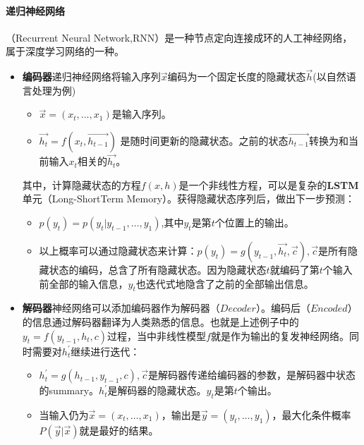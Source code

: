 \paragraph{递归神经网络}\cite{ wiki:RNN}（Recurrent Neural Network,RNN）是一种节点定向连接成环的人工神经网络，属于深度学习网络的一种。
\begin{itemize}
  \item \textbf{编码器}递归神经网络将输入序列$\vec{x}$编码为一个固定长度的隐藏状态$\vec{h}$(以自然语言处理为例)
  \begin{itemize}
    \item $\vec{x}=\left(x_{t}, \ldots, x_{1}\right)$是输入序列。
    \item $\overrightarrow{h_{t}}=f\left(x_{t}, \overrightarrow{h_{t-1}}\right)$ 是随时间更新的隐藏状态。之前的状态$\overrightarrow{h_{t-1}}$转换为和当前输入$x_t$相关的$\overrightarrow{h_{t}}$。
  \end{itemize}
  其中，计算隐藏状态的方程$f(x,h)$是一个非线性方程，可以是复杂的\textbf{LSTM}单元（Long-ShortTerm Memory）。获得隐藏状态序列后，做出下一步预测：
  \begin{itemize}
    \item $p\left(y_{t}\right)=p\left(y_{t} | y_{t-1}, \ldots, y_{1}\right)$,其中$y_{t}$是第$t$个位置上的输出。
    \item 以上概率可以通过隐藏状态来计算：$p\left(y_{t}\right)=g\left(y_{t-1}, \overrightarrow{h_{t}}, \vec{c}\right), \vec{c}$是所有隐藏状态的编码，总含了所有隐藏状态。因为隐藏状态$t$就编码了第$t$个输入前全部的输入信息，$y_{t}$也迭代式地隐含了之前的全部输出信息。
  \end{itemize}
  \item \textbf{解码器}神经网络可以添加编码器作为解码器（$Decoder$）。编码后（$Encoded$）的信息通过解码器翻译为人类熟悉的信息。也就是上述例子中的$y_{t}=f\left(y_{t-1}, h_{t}, c\right)$过程，当中非线性模型$f$就是作为输出的复发神经网络。同时需要对$h_t^{'}$继续进行迭代：
  \begin{itemize}
    \item $h_{t}^{\prime}=g\left(h_{t-1}, y_{t-1}, c\right), \vec{c}$是解码器传递给编码器的参数，是解码器中状态的summary。$h_t^{'}$是解码器的隐藏状态。$y_t$是第$t$个输出。
    \item 当输入仍为$\vec{x}=\left(x_{t}, \ldots, x_{1}\right)$，输出是$\vec{y}=\left(y_{t}, \ldots, y_{1}\right)$，最大化条件概率$P(\vec{y} | \vec{x})$就是最好的结果。
  \end{itemize}
\end{itemize}

